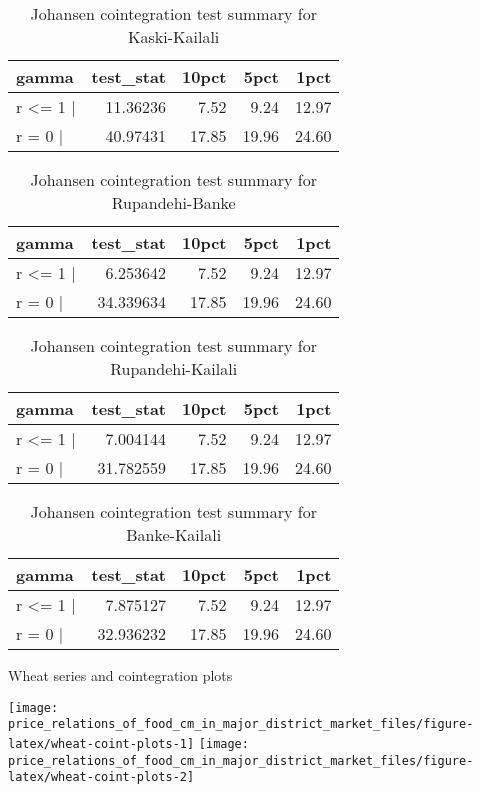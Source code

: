 \documentclass[12pt,]{article}
\begin{document}
\begin{longtable}[t]{lrrrr}
\caption{\label{tab:wheat-cajo-test}Johansen cointegration test summary for Kaski-Kailali}\\
\toprule
gamma & test\_stat & 10pct & 5pct & 1pct\\
\midrule
r <= 1 | & 11.36236 & 7.52 & 9.24 & 12.97\\
r = 0  | & 40.97431 & 17.85 & 19.96 & 24.60\\
\bottomrule
\end{longtable}

\begin{longtable}[t]{lrrrr}
\caption{\label{tab:wheat-cajo-test}Johansen cointegration test summary for Rupandehi-Banke}\\
\toprule
gamma & test\_stat & 10pct & 5pct & 1pct\\
\midrule
r <= 1 | & 6.253642 & 7.52 & 9.24 & 12.97\\
r = 0  | & 34.339634 & 17.85 & 19.96 & 24.60\\
\bottomrule
\end{longtable}

\begin{longtable}[t]{lrrrr}
\caption{\label{tab:wheat-cajo-test}Johansen cointegration test summary for Rupandehi-Kailali}\\
\toprule
gamma & test\_stat & 10pct & 5pct & 1pct\\
\midrule
r <= 1 | & 7.004144 & 7.52 & 9.24 & 12.97\\
r = 0  | & 31.782559 & 17.85 & 19.96 & 24.60\\
\bottomrule
\end{longtable}

\begin{longtable}[t]{lrrrr}
\caption{\label{tab:wheat-cajo-test}Johansen cointegration test summary for Banke-Kailali}\\
\toprule
gamma & test\_stat & 10pct & 5pct & 1pct\\
\midrule
r <= 1 | & 7.875127 & 7.52 & 9.24 & 12.97\\
r = 0  | & 32.936232 & 17.85 & 19.96 & 24.60\\
\bottomrule
\end{longtable}

Wheat series and cointegration plots

\begin{center}\texttt{[image: price\_relations\_of\_food\_cm\_in\_major\_district\_market\_files/figure-latex/wheat-coint-plots-1]} \texttt{[image: price\_relations\_of\_food\_cm\_in\_major\_district\_market\_files/figure-latex/wheat-coint-plots-2]} \end{center}
\end{document}
